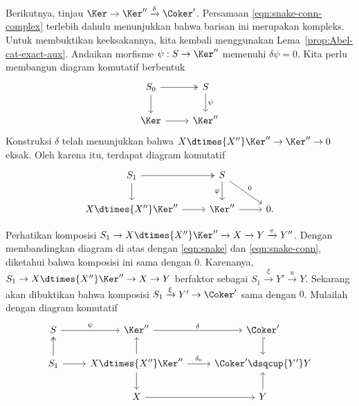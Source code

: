 \begin{bukti}
	Berikutnya, tinjau $\Ker \to \Ker'' \xrightarrow{\delta} \Coker'$.
	Persamaan \eqref{eqn:snake-conn-complex} terlebih dahulu menunjukkan
	bahwa barisan ini merupakan kompleks. Untuk membuktikan keeksakannya,
	kita kembali menggunakan Lema~\ref{prop:Abel-cat-exact-aux}. Andaikan
	morfisme $\psi: S \to \Ker''$ memenuhi $\delta \psi = 0$. Kita perlu membangun
	diagram komutatif berbentuk
	\begin{equation}\label{eqn:snake-lemma-aux-2}
	\begin{tikzcd}
		S_0 \arrow[d] \arrow[twoheadrightarrow, r] & S \arrow[d, "\psi"] \\
		\Ker \arrow[r] & \Ker''
	\end{tikzcd}\end{equation}
	Konstruksi $\delta$ telah menunjukkan bahwa
	$X \dtimes{X''} \Ker'' \to \Ker'' \to 0$ eksak. Oleh karena itu,
	terdapat diagram komutatif
	\begin{equation}\label{eqn:snake-lemma-aux-3}
	\begin{tikzcd}
		S_1 \arrow[twoheadrightarrow, r] \arrow[d] & S \arrow[d, "\psi"'] \arrow[rd, "0"] & \\
		X \dtimes{X''} \Ker'' \arrow[r] & \Ker'' \arrow[r] & 0 .
	\end{tikzcd}\end{equation}

	Perhatikan komposisi
	$S_1 \to X \dtimes{X''} \Ker'' \to X \to Y \xrightarrow{v} Y''$.
	Dengan membandingkan diagram di atas dengan \eqref{eqn:snake} dan
	\eqref{eqn:snake-conn}, diketahui bahwa komposisi ini sama dengan $0$.
	Karenanya, $S_1 \to X \dtimes{X''} \Ker'' \to X \to Y$ berfaktor
	sebagai $S_1 \xrightarrow{\xi} Y' \xrightarrow{u} Y$. Sekarang akan
	dibuktikan bahwa komposisi $S_1 \xrightarrow{\xi} Y' \to \Coker'$
	sama dengan $0$. Mulailah dengan diagram komutatif
	\[\begin{tikzcd}
		S \arrow[r, "\psi"] & \Ker'' \arrow[r, "\delta"] & \Coker' \arrow[hookrightarrow, d] \\
		S_1 \arrow[twoheadrightarrow, u] \arrow[r] & X \dtimes{X''} \Ker'' \arrow[r, "\delta_0"] \arrow[u] \arrow[d] & \Coker' \dsqcup{Y'} Y \\
		& X \arrow[r] & Y \arrow[u]
	\end{tikzcd}\]


\end{bukti}
